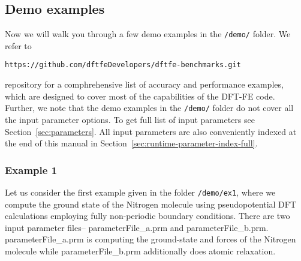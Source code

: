 \subsection{Demo examples}
Now we will walk you through a few demo examples in the \verb|/demo/| folder. We refer to
\begin{verbatim}
https://github.com/dftfeDevelopers/dftfe-benchmarks.git
\end{verbatim}
repository for a comphrehensive list of accuracy and performance examples, which are designed to cover most of the capabilities of the DFT-FE code. Further, we note that the demo examples in the \verb|/demo/| folder do not cover all the input parameter options. To get full list of input parameters see Section~\ref{sec:parameters}. All input parameters are also conveniently indexed at the end of this manual in Section~\ref{sec:runtime-parameter-index-full}. 
\subsubsection{Example 1}\label{sec:example1}
Let us consider the first example given in the folder
\verb|/demo/ex1|, where we compute the ground state of the Nitrogen molecule using pseudopotential DFT calculations employing fully non-periodic boundary conditions.
There are two input parameter files-- parameterFile\_a.prm and parameterFile\_b.prm. parameterFile\_a.prm is
computing the ground-state and forces of the Nitrogen molecule while parameterFile\_b.prm additionally does atomic relaxation.

